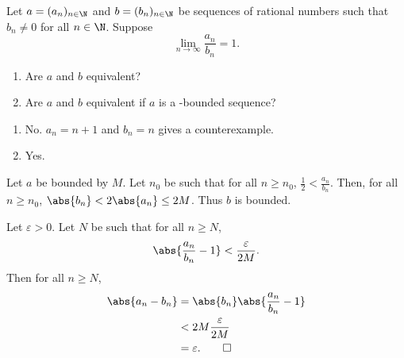 \documentclass[12pt]{article}
\begin{document}
\begin{problem*}
    Let $a = (a_n)_{n \in \N}$ and $b = (b_n)_{n \in \N}$ be sequences of
    rational numbers such that $b_n \ne 0$ for all $n \in \N$.
    Suppose \[
        \lim_{n \to \infty} \frac{a_n}{b_n} = 1.
    \]
    \begin{enumerate}
        \item Are $a$ and $b$ equivalent?
        \item Are $a$ and $b$ equivalent if $a$ is a \Q-bounded sequence?
    \end{enumerate}
\end{problem*}
\begin{solution} \leavevmode
    \begin{enumerate}
        \item No. $a_n = n + 1$ and $b_n = n$ gives a counterexample.
        \item Yes.
    \end{enumerate}
    Let $a$ be bounded by $M$.
    Let $n_0$ be such that for all $n \ge n_0$, $\frac12 < \frac{a_n}{b_n}$.
    Then, for all $n \ge n_0$, $\abs{b_n} < 2 \abs{a_n} \le 2M$.
    Thus $b$ is bounded.

    Let $\varepsilon > 0$.
    Let $N$ be such that for all $n \ge N$, \[
        \abs{\frac{a_n}{b_n} - 1} < \frac{\varepsilon}{2M}.
    \] Then for all $n \ge N$, \begin{align*}
        \abs{a_n - b_n} &= \abs{b_n} \abs{\frac{a_n}{b_n} - 1} \\
                  &< 2M \frac{\varepsilon}{2M} \\
                  &= \varepsilon. \qedhere
    \end{align*}
\end{solution}
\end{document}
